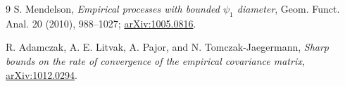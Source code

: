 \documentclass[10pt]{article}
\begin{document}
\begin{thebibliography}{9}
S. Mendelson,
\emph{Empirical processes with bounded \(\psi_1\) diameter},
Geom. Funct. Anal. 20 (2010), 988--1027;
\href{https://arxiv.org/abs/1005.0816}{arXiv:1005.0816}.

R. Adamczak, A. E. Litvak, A. Pajor, and N. Tomczak-Jaegermann,
\emph{Sharp bounds on the rate of convergence of the empirical covariance
matrix},
\href{https://arxiv.org/abs/1012.0294}{arXiv:1012.0294}.
\end{thebibliography}
\end{document}
